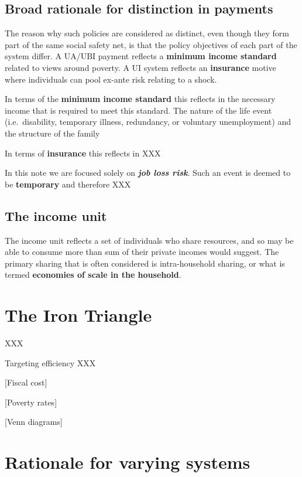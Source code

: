 \documentclass[
  letterpaper,
  DIV=11,
  numbers=noendperiod]{scrreprt}
\begin{document}
\hypertarget{broad-rationale-for-distinction-in-payments}{%
\subsection{Broad rationale for distinction in
payments}\label{broad-rationale-for-distinction-in-payments}}

The reason why such policies are considered as distinct, even though
they form part of the same social safety net, is that the policy
objectives of each part of the system differ. A UA/UBI payment reflects
a \textbf{minimum income standard} related to views around poverty. A UI
system reflects an \textbf{insurance} motive where individuals can pool
ex-ante risk relating to a shock.

In terms of the \textbf{minimum income standard} this reflects in the
necessary income that is required to meet this standard. The nature of
the life event (i.e.~disability, temporary illness, redundancy, or
voluntary unemployment) and the structure of the family

In terms of \textbf{insurance} this reflects in XXX

In this note we are focused solely on \textbf{\emph{job loss risk}}.
Such an event is deemed to be \textbf{temporary} and therefore XXX

\hypertarget{the-income-unit}{%
\subsection{The income unit}\label{the-income-unit}}

The income unit reflects a set of individuals who share resources, and
so may be able to consume more than sum of their private incomes would
suggest. The primary sharing that is often considered is intra-household
sharing, or what is termed \textbf{economies of scale in the household}.

\hypertarget{the-iron-triangle}{%
\section{The Iron Triangle}\label{the-iron-triangle}}

XXX

Targeting efficiency XXX

{[}Fiscal cost{]}

{[}Poverty rates{]}

{[}Venn diagrams{]}

\hypertarget{rationale-for-varying-systems}{%
\section{Rationale for varying
systems}\label{rationale-for-varying-systems}}
\end{document}
